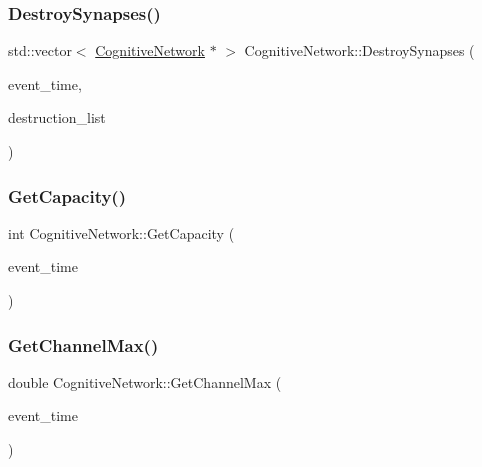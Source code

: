 \mbox{\label{classCognitiveNetwork_a141e9e8e6337d42fc19edd75bb50e47b}} 
\subsubsection{\texorpdfstring{Destroy\+Synapses()}{DestroySynapses()}}
{\footnotesize\ttfamily std\+::vector$<$ \mbox{\hyperlink{classCognitiveNetwork}{Cognitive\+Network}} $\ast$ $>$ Cognitive\+Network\+::\+Destroy\+Synapses (\begin{DoxyParamCaption}\item[{std\+::chrono\+::time\+\_\+point$<$ \mbox{\hyperlink{universe_8h_a0ef8d951d1ca5ab3cfaf7ab4c7a6fd80}{Clock}} $>$}]{event\+\_\+time,  }\item[{std\+::vector$<$ \mbox{\hyperlink{classCognitiveNetwork}{Cognitive\+Network}} $\ast$$>$}]{destruction\+\_\+list }\end{DoxyParamCaption})}

\mbox{\label{classCognitiveNetwork_a6bb3fc06029c260dd658d0db072625a7}} 
\subsubsection{\texorpdfstring{Get\+Capacity()}{GetCapacity()}}
{\footnotesize\ttfamily int Cognitive\+Network\+::\+Get\+Capacity (\begin{DoxyParamCaption}\item[{std\+::chrono\+::time\+\_\+point$<$ \mbox{\hyperlink{universe_8h_a0ef8d951d1ca5ab3cfaf7ab4c7a6fd80}{Clock}} $>$}]{event\+\_\+time }\end{DoxyParamCaption})\hspace{0.3cm}{\ttfamily [inline]}}

\mbox{\label{classCognitiveNetwork_ab67da8690b83618d88f88411121d7071}} 
\subsubsection{\texorpdfstring{Get\+Channel\+Max()}{GetChannelMax()}}
{\footnotesize\ttfamily double Cognitive\+Network\+::\+Get\+Channel\+Max (\begin{DoxyParamCaption}\item[{std\+::chrono\+::time\+\_\+point$<$ \mbox{\hyperlink{universe_8h_a0ef8d951d1ca5ab3cfaf7ab4c7a6fd80}{Clock}} $>$}]{event\+\_\+time }\end{DoxyParamCaption})\hspace{0.3cm}{\ttfamily [inline]}}

